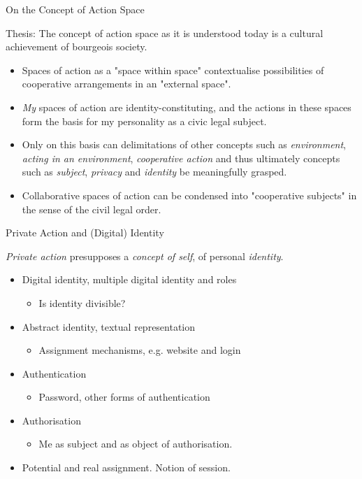 \documentclass{beamer}
\begin{document}
\begin{frame}{On the Concept of Action Space}
  \begin{block}{Thesis:}
    The concept of action space as it is understood today is a cultural
    achievement of bourgeois society.
  \end{block}\small
\begin{itemize}
\item Spaces of action as a "space within space" contextualise possibilities
  of cooperative arrangements in an "external space".
\item \emph{My} spaces of action are identity-constituting, and the actions in
  these spaces form the basis for my personality as a civic legal subject.
\item Only on this basis can delimitations of other concepts such as
  \emph{environment}, \emph{acting in an environment}, \emph{cooperative
    action} and thus ultimately concepts such as \emph{subject},
  \emph{privacy} and \emph{identity} be meaningfully grasped.
\item Collaborative spaces of action can be condensed into "cooperative
  subjects" in the sense of the civil legal order.
\end{itemize}
\end{frame}
\begin{frame}{Private Action and (Digital) Identity}

\emph{Private action} presupposes a \emph{concept of self}, of personal
\emph{identity}.
\begin{itemize}
\item Digital identity, multiple digital identity and roles
  \begin{itemize}
  \item[] Is identity divisible?
  \end{itemize}
\item Abstract identity, textual representation
  \begin{itemize}
  \item[] Assignment mechanisms, e.g. website and login
  \end{itemize}
\item Authentication
  \begin{itemize}
  \item[] Password, other forms of authentication
  \end{itemize}
\item Authorisation
  \begin{itemize}
  \item[] Me as subject and as object of authorisation.
  \end{itemize}
\item Potential and real assignment. Notion of session.
\end{itemize}
\end{frame}
\end{document}
